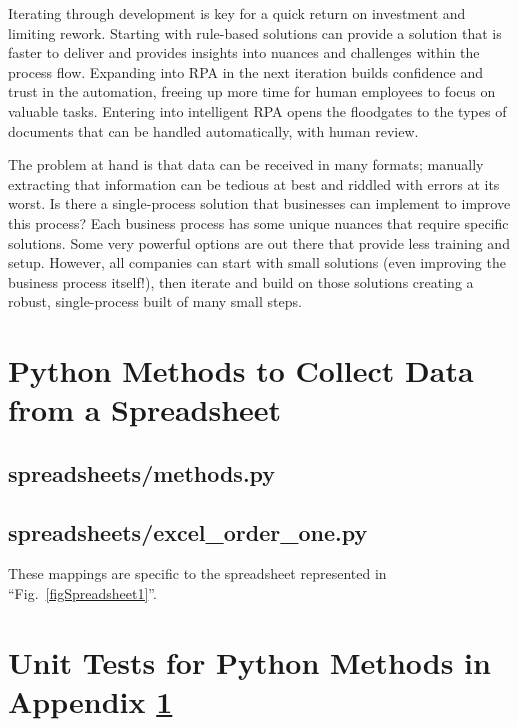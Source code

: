 \documentclass[conference]{IEEEtran}
\begin{document}
Iterating through development is key for a quick return on investment and limiting rework. Starting with rule-based solutions can provide a solution that is faster to deliver and provides insights into nuances and challenges within the process flow. Expanding into RPA in the next iteration builds confidence and trust in the automation, freeing up more time for human employees to focus on valuable tasks. Entering into intelligent RPA opens the floodgates to the types of documents that can be handled automatically, with human review.

The problem at hand is that data can be received in many formats; manually extracting that information can be tedious at best and riddled with errors at its worst. Is there a single-process solution that businesses can implement to improve this process? Each business process has some unique nuances that require specific solutions. Some very powerful options are out there that provide less training and setup. However, all companies can start with small solutions (even improving the business process itself!), then iterate and build on those solutions creating a robust, single-process built of many small steps.

\newpage



\onecolumn
\appendices

\newpage
\section{Python Methods to Collect Data from a Spreadsheet} \label{appendixOrderOne}
    \subsection{spreadsheets/methods.py}
    

    \newpage
    \subsection{spreadsheets/excel\_order\_one.py}
    These mappings are specific to the spreadsheet represented in ``Fig.~\ref{figSpreadsheet1}''.
    

\newpage
\section{Unit Tests for Python Methods in Appendix \ref{appendixOrderOne}} \label{appendixOrderOneTests}
\end{document}
